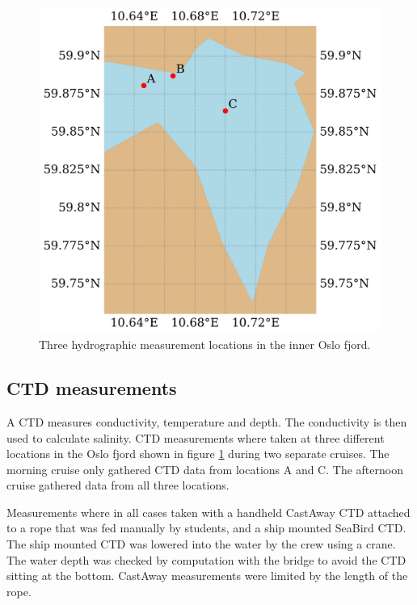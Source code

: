 \documentclass[a4paper,10pt,english]{article}
\begin{document}
\setlength{\intextsep}{-30pt}
\begin{figure}  %
        \centering
        \includegraphics[width=\linewidth]{../figures/station_map_3_stations.png}
        \caption{Three hydrographic measurement locations in the inner Oslo fjord.}
        \label{fig:map_ctd}
\end{figure}

\subsection{CTD measurements}
A CTD measures conductivity, temperature and depth. The conductivity is then used to calculate salinity. CTD measurements where taken at three different locations in the Oslo fjord shown in figure \ref*{fig:map_ctd} during two separate cruises. The morning cruise only gathered CTD data from locations A and C. The afternoon cruise gathered data from all three locations. 

Measurements where in all cases taken with a handheld CastAway CTD attached to a rope that was fed manually by students, and a ship mounted SeaBird CTD. The ship mounted CTD was lowered into the water by the crew using a crane. The water depth was checked by computation with the bridge to avoid the CTD sitting at the bottom. CastAway measurements were limited by the length of the rope.
\end{document}
